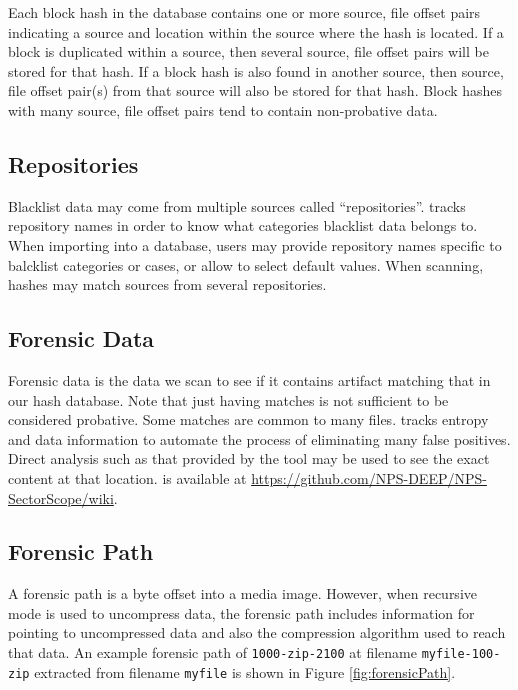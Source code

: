 \documentclass[11pt,fleqn]{article} %
\begin{document}
Each block hash in the database contains one or more source, file offset pairs indicating a source and location within the source where the hash is located.  If a block is duplicated within a source, then several source, file offset pairs will be stored for that hash.  If a block hash is also found in another source, then source, file offset pair(s) from that source will also be stored for that hash. Block hashes with many source, file offset pairs tend to contain non-probative data.\\

\subsection{Repositories}
Blacklist data may come from multiple sources called ``repositories''. \hdb tracks repository names in order to know what categories blacklist data belongs to. When importing into a database, users may provide repository names specific to balcklist categories or cases, or allow \hdb to select default values.  When scanning, hashes may match sources from several repositories.\\

\subsection{Forensic Data}
Forensic data is the data we scan to see if it contains artifact matching
that in our hash database.
Note that just having matches is not sufficient to be considered probative.
Some matches are common to many files.
\hdb tracks entropy and data information to automate the process
of eliminating many false positives.
Direct analysis such as that provided by the \sscope tool
may be used to see the exact content at that location.
\sscope is available at \url{https://github.com/NPS-DEEP/NPS-SectorScope/wiki}.

\subsection{Forensic Path}
A forensic path is a byte offset into a media image. However, when recursive mode is used to uncompress data, the forensic path includes information for pointing to uncompressed data and also the compression algorithm used to reach that data. An example forensic path of \texttt{1000-zip-2100} at filename \texttt{myfile-100-zip} extracted from filename \texttt{myfile} is shown in Figure \ref{fig:forensicPath}.\\
\end{document}
